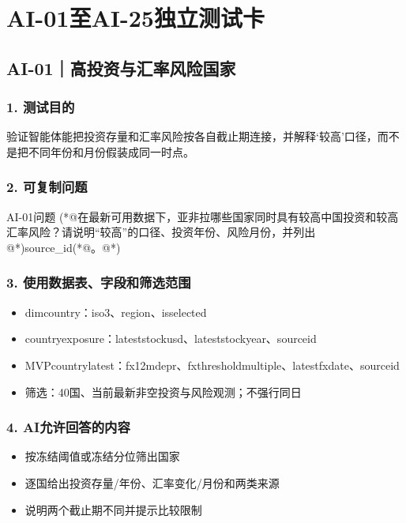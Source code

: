 \documentclass[UTF8,openany,zihao=-4]{ctexbook}
\renewcommand{\_}{\textunderscore\allowbreak}
\begin{document}
\clearpage
\chapter{AI-01至AI-25独立测试卡}
\section{AI-01｜高投资与汇率风险国家}
\subsection*{1. 测试目的}
验证智能体能把投资存量和汇率风险按各自截止期连接，并解释‘较高’口径，而不是把不同年份和月份假装成同一时点。


\subsection*{2. 可复制问题}
\begin{PromptBox}{AI-01问题}
(*@{\promptcjk 在最新可用数据下，亚非拉哪些国家同时具有较高中国投资和较高汇率风险？请说明“较高”的口径、投资年份、风险月份，并列出}@*)source_id(*@{\promptcjk 。}@*)
\end{PromptBox}

\subsection*{3. 使用数据表、字段和筛选范围}
\begin{itemize}
\item dim\_country：iso3、region、is\_selected\_40
\item country\_exposure：latest\_stock\_usd、latest\_stock\_year、source\_id
\item MVP\_country\_latest：fx\_12m\_depr、fx\_threshold\_multiple、latest\_fx\_date、source\_id
\item 筛选：40国、当前最新非空投资与风险观测；不强行同日
\end{itemize}

\subsection*{4. AI允许回答的内容}
\begin{itemize}
\item 按冻结阈值或冻结分位筛出国家
\item 逐国给出投资存量/年份、汇率变化/月份和两类来源
\item 说明两个截止期不同并提示比较限制
\end{itemize}
\end{document}

